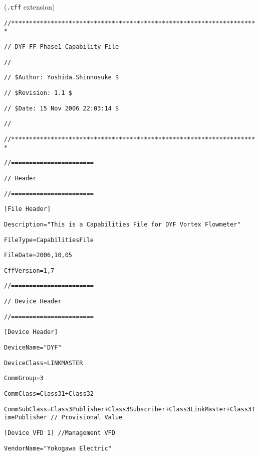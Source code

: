 





\noindent
{} ({\tt .cff} extension)

\vskip 10pt

{\tt //*********************************************************************}

{\tt //    DYF-FF Phase1 Capability File}

{\tt //}

{\tt // \$Author:   Yoshida.Shinnosuke  \$}

{\tt // \$Revision:   1.1  \$}

{\tt // \$Date:   15 Nov 2006 22:03:14  \$}

{\tt //}

{\tt //*********************************************************************}

\vskip 10pt

{\tt //=======================}

{\tt //   Header}

{\tt //=======================}

{\tt [File Header]}

{\tt Description="This is a Capabilities File for DYF Vortex Flowmeter"}

{\tt FileType=CapabilitiesFile}

{\tt FileDate=2006,10,05}

{\tt CffVersion=1,7}

\vskip 10pt

{\tt //=======================}

{\tt //   Device Header}

{\tt //=======================}

{\tt [Device Header]}

{\tt DeviceName="DYF"}

{\tt DeviceClass=LINKMASTER}

{\tt CommGroup=3}

{\tt CommClass=Class31+Class32}

{\tt CommSubClass=Class3Publisher+Class3Subscriber+Class3LinkMaster+Class3TimePublisher   // Provisional Value}

\vskip 10pt

{\tt [Device VFD 1]  //Management VFD}

{\tt VendorName="Yokogawa Electric"}

